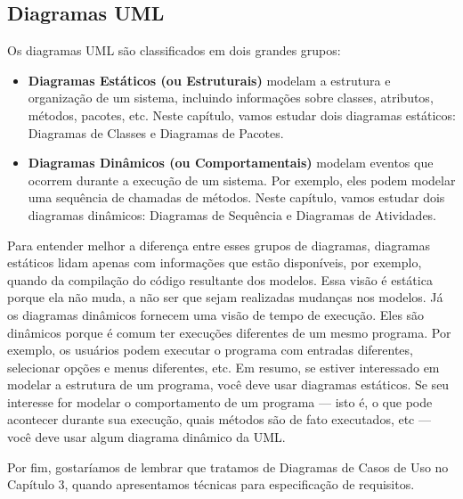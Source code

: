 \documentclass[
  11pt,
  twoside]{book}
\begin{document}
\hypertarget{diagramas-uml}{%
\subsection*{Diagramas UML}\label{diagramas-uml}}

 

Os diagramas UML são classificados em dois grandes grupos:

\begin{itemize}
\item
  \textbf{Diagramas Estáticos (ou Estruturais)} modelam a estrutura e
  organização de um sistema, incluindo informações sobre classes,
  atributos, métodos, pacotes, etc. Neste capítulo, vamos estudar dois
  diagramas estáticos: Diagramas de Classes e Diagramas de Pacotes.
\item
  \textbf{Diagramas Dinâmicos (ou Comportamentais)} modelam eventos que
  ocorrem durante a execução de um sistema. Por exemplo, eles podem
  modelar uma sequência de chamadas de métodos. Neste capítulo, vamos
  estudar dois diagramas dinâmicos: Diagramas de Sequência e Diagramas
  de Atividades.
\end{itemize}

Para entender melhor a diferença entre esses grupos de diagramas,
diagramas estáticos lidam apenas com informações que estão disponíveis,
por exemplo, quando da compilação do código resultante dos modelos. Essa
visão é estática porque ela não muda, a não ser que sejam realizadas
mudanças nos modelos. Já os diagramas dinâmicos fornecem uma visão de
tempo de execução. Eles são dinâmicos porque é comum ter execuções
diferentes de um mesmo programa. Por exemplo, os usuários podem executar
o programa com entradas diferentes, selecionar opções e menus
diferentes, etc. Em resumo, se estiver interessado em modelar a
estrutura de um programa, você deve usar diagramas estáticos. Se seu
interesse for modelar o comportamento de um programa --- isto é, o que
pode acontecer durante sua execução, quais métodos são de fato
executados, etc --- você deve usar algum diagrama dinâmico da UML.

Por fim, gostaríamos de lembrar que tratamos de Diagramas de Casos de
Uso no Capítulo 3, quando apresentamos técnicas para especificação de
requisitos.
\end{document}

